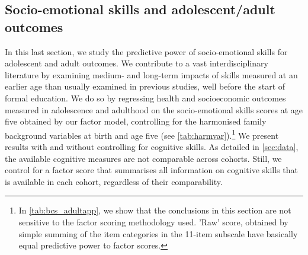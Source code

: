 \subsection{Socio-emotional skills and adolescent/adult outcomes}

In this last section, we study the predictive power of socio-emotional skills for adolescent and adult outcomes. We contribute to a vast interdisciplinary literature by examining medium- and long-term impacts of skills measured at an earlier age than usually examined in previous studies, well before the start of formal education. We do so by regressing health and socioeconomic outcomes measured in adolescence and adulthood on the socio-emotional skills scores at age five obtained by our factor model, controlling for the harmonised family background variables at birth and age five (see \autoref{tab:harmvar}).\footnote{In \autoref{tab:bcs_adultapp}, we show that the conclusions in this section are not sensitive to the factor scoring methodology used. 'Raw' score, obtained by simple summing of the item categories in the 11-item subscale have basically equal predictive power to factor scores.} We present results with and without controlling for cognitive skills. As detailed in \autoref{sec:data}, the available cognitive measures are not comparable across cohorts. Still, we control for a factor score that summarises all information on cognitive skills that is available in each cohort, regardless of their comparability.

